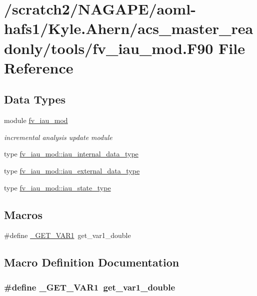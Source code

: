 \section{/scratch2/\-N\-A\-G\-A\-P\-E/aoml-\/hafs1/\-Kyle.Ahern/acs\-\_\-master\-\_\-readonly/tools/fv\-\_\-iau\-\_\-mod.F90 File Reference}
\label{fv__iau__mod_8F90}
\subsection*{Data Types}
\begin{DoxyCompactItemize}
\item 
module \hyperlink{classfv__iau__mod}{fv\-\_\-iau\-\_\-mod}
\begin{DoxyCompactList}\small\item\em incremental analysis update module \end{DoxyCompactList}\item 
type \hyperlink{structfv__iau__mod_1_1iau__internal__data__type}{fv\-\_\-iau\-\_\-mod\-::iau\-\_\-internal\-\_\-data\-\_\-type}
\item 
type \hyperlink{structfv__iau__mod_1_1iau__external__data__type}{fv\-\_\-iau\-\_\-mod\-::iau\-\_\-external\-\_\-data\-\_\-type}
\item 
type \hyperlink{structfv__iau__mod_1_1iau__state__type}{fv\-\_\-iau\-\_\-mod\-::iau\-\_\-state\-\_\-type}
\end{DoxyCompactItemize}
\subsection*{Macros}
\begin{DoxyCompactItemize}
\item 
\#define \hyperlink{fv__iau__mod_8F90_aa573d7adaa945bb61ee4d9ca00756c63}{\-\_\-\-G\-E\-T\-\_\-\-V\-A\-R1}~get\-\_\-var1\-\_\-double
\end{DoxyCompactItemize}


\subsection{Macro Definition Documentation}
\subsubsection[{\-\_\-\-G\-E\-T\-\_\-\-V\-A\-R1}]{\setlength{\rightskip}{0pt plus 5cm}\#define \-\_\-\-G\-E\-T\-\_\-\-V\-A\-R1~get\-\_\-var1\-\_\-double}\label{fv__iau__mod_8F90_aa573d7adaa945bb61ee4d9ca00756c63}
